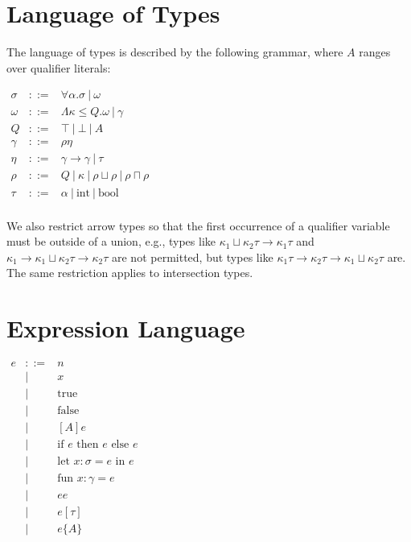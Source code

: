 \documentclass{article}
\begin{document}
\section{Language of Types}

The language of types is described by the following grammar, where $A$ ranges over qualifier literals:

\begin{math}
\begin{array}{rcl}
\sigma & ::= & \forall \alpha . \sigma\ |\ \omega \\

\omega & ::= & \Lambda \kappa \le Q . \omega\ |\ \gamma \\

Q & ::= & \top\ |\ \bot\ |\ A \\

\gamma & ::= & \rho \eta \\

\eta & ::= & \gamma \rightarrow \gamma\ |\ \tau \\

\rho & ::= & Q\ |\ \kappa\ |\ \rho \sqcup \rho\ |\ \rho \sqcap \rho \\

\tau & ::= & \alpha\ |\ \textrm{int}\ |\ \textrm{bool} \\

\end{array}
\end{math}

We also restrict arrow types so that the first occurrence of a qualifier variable must be outside of a union, e.g., types like ${\kappa}_1 \sqcup {\kappa}_2 \tau \rightarrow {\kappa}_1 \tau$ and ${\kappa}_1 \rightarrow {\kappa}_1 \sqcup {\kappa}_2 \tau \rightarrow {\kappa}_2 \tau$ are not permitted, but types like ${\kappa}_1 \tau \rightarrow {\kappa}_2 \tau \rightarrow {\kappa}_1 \sqcup {\kappa}_2 \tau$ are.
  The same restriction applies to intersection types.


\section{Expression Language}

\begin{math}
\begin{array}{rrl}

e & ::= & n \\
  & | & x \\
  & | & \textrm{true} \\
  & | & \textrm{false} \\
  & | & [ A ] e \\
  & | & \textrm{if } e \textrm{ then } e \textrm{ else } e \\
  & | & \textrm{let } x:\sigma = e \textrm{ in } e \\
  & | & \textrm{fun } x:\gamma = e \\
  & | & e e \\
  & | & e[\tau] \\
  & | & e\{A\} \\

\end{array}
\end{math}
\end{document}

